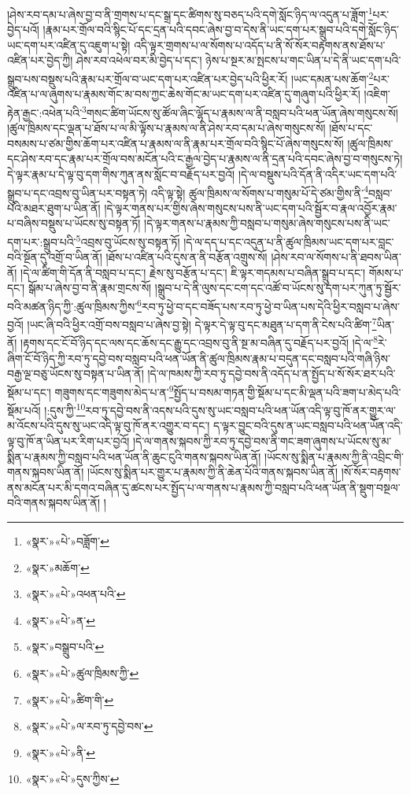 །ཤེས་རབ་དམ་པ་ཞེས་བྱ་བ་ནི་གྲགས་པ་དང་སྒྲ་དང་ཚིགས་སུ་བཅད་པའི་དགེ་སློང་ཉིད་ལ་འདུན་པ་ཟློག་\footnote{«སྣར་»«པེ་»བཟློག་}པར་བྱེད་པའོ། །རྣམ་པར་གྲོལ་བའི་སྙིང་པོ་དང་དྲན་པའི་དབང་ཞེས་བྱ་བ་དེས་ནི་ཡང་དག་པར་སྒྲུབ་པའི་དགེ་སློང་ཉིད་ཡང་དག་པར་འཛིན་དུ་འཇུག་པ་སྟེ། འདི་ལྟར་གྲགས་པ་ལ་སོགས་པ་འདོད་པ་ནི་སོ་སོར་བརྟགས་ནས་ཐོས་པ་འཛིན་པར་བྱེད་ཀྱི། ཤེས་རབ་འཕེལ་བར་མི་བྱེད་པ་དང་། ཉེས་པ་སྔར་མ་སྤངས་པ་གང་ཡིན་པ་དེ་ནི་ཡང་དག་པའི་སྒྲུབ་པས་བསྡུས་པའི་རྣམ་པར་གྲོལ་བ་ཡང་དག་པར་འཛིན་པར་བྱེད་པའི་ཕྱིར་རོ། །ཡང་དམན་པས་ཆོག་\footnote{«སྣར་»མཆོག་}པར་འཛིན་པ་ལ་ཞུགས་པ་རྣམས་གོང་མ་བས་ཀྱང་ཆེས་གོང་མ་ཡང་དག་པར་འཛིན་དུ་གཞུག་པའི་ཕྱིར་རོ། །འཇིག་རྟེན་རྒྱང་:འཕེན་པའི་\footnote{«སྣར་»«པེ་»འཕན་པའི་}གསང་ཚིག་ཡོངས་སུ་ཚོལ་ཞིང་ལྷོད་པ་རྣམས་ལ་ནི་བསླབ་པའི་ཕན་ཡོན་ཞེས་གསུངས་སོ། །ཚུལ་ཁྲིམས་དང་ལྡན་པ་ཐོས་པ་ལ་མི་ལྟོས་པ་རྣམས་ལ་ནི་ཤེས་རབ་དམ་པ་ཞེས་གསུངས་སོ། །ཐོས་པ་དང་བསམས་པ་ཙམ་གྱིས་ཆོག་པར་འཛིན་པ་རྣམས་ལ་ནི་རྣམ་པར་གྲོལ་བའི་སྙིང་པོ་ཞེས་གསུངས་སོ། །ཚུལ་ཁྲིམས་དང་ཤེས་རབ་དང་རྣམ་པར་གྲོལ་བས་མངོན་པའི་ང་རྒྱལ་བྱེད་པ་རྣམས་ལ་ནི་དྲན་པའི་དབང་ཞེས་བྱ་བ་གསུངས་ཏེ། དེ་ལྟར་རྣམ་པ་དེ་ལྟ་བུ་དག་གིས་ཀུན་ནས་སློང་བ་བརྗོད་པར་བྱའོ། །དེ་ལ་བསྡུས་པའི་དོན་ནི་འདིར་ཡང་དག་པའི་སྒྲུབ་པ་དང་འབྲས་བུ་ཡིན་པར་བསྟན་ཏེ། འདི་ལྟ་སྟེ། ཚུལ་ཁྲིམས་ལ་སོགས་པ་གསུམ་པོ་དེ་ཙམ་གྱིས་ནི་\footnote{«སྣར་»«པེ་»ན་}བསླབ་པའི་མཐར་ཐུག་པ་ཡིན་ནོ། །དེ་ལྟར་གནས་པར་གྱིས་ཞེས་གསུངས་པས་ནི་ཡང་དག་པའི་སྦྱོར་བ་རྣལ་འབྱོར་རྣམ་པ་བཞིས་བསྡུས་པ་ཡོངས་སུ་བསྟན་ཏོ། །དེ་ལྟར་གནས་པ་རྣམས་ཀྱི་བསླབ་པ་གསུམ་ཞེས་གསུངས་པས་ནི་ཡང་དག་པར་:སྒྲུབ་པའི་\footnote{«སྣར་»བསྒྲུབ་པའི་}འབྲས་བུ་ཡོངས་སུ་བསྟན་ཏོ། །དེ་ལ་དད་པ་དང་འདུན་པ་ནི་ཚུལ་ཁྲིམས་ཡང་དག་པར་བླང་བའི་སྔོན་དུ་འགྲོ་བ་ཡིན་ནོ། །ཐོས་པ་འཛིན་པའི་དུས་ན་ནི་བརྩོན་འགྲུས་སོ། །ཤེས་རབ་ལ་སོགས་པ་ནི་ཐབས་ཡིན་ནོ། །དེ་ལ་ཚིག་གི་དོན་ནི་བསླབ་པ་དང་། རྗེས་སུ་བརྩོན་པ་དང་། ཇི་ལྟར་གདམས་པ་བཞིན་སྒྲུབ་པ་དང་། གོམས་པ་དང་། སྒོམ་པ་ཞེས་བྱ་བ་ནི་རྣམ་གྲངས་སོ། །སྒྲུབ་པ་དེ་ནི་ལུས་དང་ངག་དང་འཚོ་བ་ཡོངས་སུ་དག་པར་ཀུན་ཏུ་སྦྱོར་བའི་མཚན་ཉིད་ཀྱི་:ཚུལ་ཁྲིམས་ཀྱིས་\footnote{«སྣར་»«པེ་»ཚུལ་ཁྲིམས་ཀྱི་}རབ་ཏུ་ཕྱེ་བ་དང་བཟོད་པས་རབ་ཏུ་ཕྱེ་བ་ཡིན་པས་དེའི་ཕྱིར་བསླབ་པ་ཞེས་བྱའོ། །ཡང་ཞི་བའི་ཕྱིར་འགྲོ་བས་བསླབ་པ་ཞེས་བྱ་སྟེ། དེ་ལྟར་དེ་ལྟ་བུ་དང་མཐུན་པ་དག་ནི་ངེས་པའི་ཚིག་\footnote{«སྣར་»«པེ་»ཚིག་གི་}ཡིན་ནོ། །རྟགས་དང་ངོ་བོ་ཉིད་དང་ལས་དང་ཆོས་དང་རྒྱུ་དང་འབྲས་བུ་ནི་སྔ་མ་བཞིན་དུ་བརྗོད་པར་བྱའོ། །དེ་ལ་\footnote{«སྣར་»«པེ་»ལ་རབ་ཏུ་དབྱེ་བས་}རེ་ཞིག་ངོ་བོ་ཉིད་ཀྱི་རབ་ཏུ་དབྱེ་བས་བསླབ་པའི་ཕན་ཡོན་ནི་ཚུལ་ཁྲིམས་རྣམ་པ་བདུན་དང་བསླབ་པའི་གཞི་ཉིས་བརྒྱ་ལྔ་བཅུ་ཡོངས་སུ་བསྟན་པ་ཡིན་ནོ། །དེ་ལ་ཁམས་ཀྱི་རབ་ཏུ་དབྱེ་བས་ནི་འདོད་པ་ན་སྤྱོད་པ་སོ་སོར་ཐར་པའི་སྡོམ་པ་དང་། གཟུགས་དང་གཟུགས་མེད་པ་ན་\footnote{«སྣར་»«པེ་»ནི་}སྤྱོད་པ་བསམ་གཏན་གྱི་སྡོམ་པ་དང་མི་ལྡན་པའི་ཟག་པ་མེད་པའི་སྡོམ་པའོ། །:དུས་ཀྱི་\footnote{«སྣར་»«པེ་»དུས་ཀྱིས་}རབ་ཏུ་དབྱེ་བས་ནི་འདས་པའི་དུས་སུ་ཡང་བསླབ་པའི་ཕན་ཡོན་འདི་ལྟ་བུ་ཁོ་ནར་གྱུར་ལ་མ་འོངས་པའི་དུས་སུ་ཡང་འདི་ལྟ་བུ་ཁོ་ནར་འགྱུར་བ་དང་། ད་ལྟར་བྱུང་བའི་དུས་ན་ཡང་བསླབ་པའི་ཕན་ཡོན་འདི་ལྟ་བུ་ཁོ་ན་ཡིན་པར་རིག་པར་བྱའོ། །དེ་ལ་གནས་སྐབས་ཀྱི་རབ་ཏུ་དབྱེ་བས་ནི་གང་ཟག་ཞུགས་པ་ཡོངས་སུ་མ་སྨིན་པ་རྣམས་ཀྱི་བསླབ་པའི་ཕན་ཡོན་ནི་ཆུང་ངུའི་གནས་སྐབས་ཡིན་ནོ། །ཡོངས་སུ་སྨིན་པ་རྣམས་ཀྱི་ནི་འབྲིང་གི་གནས་སྐབས་ཡིན་ནོ། །ཡོངས་སུ་སྨིན་པར་གྱུར་པ་རྣམས་ཀྱི་ནི་ཆེན་པོའི་གནས་སྐབས་ཡིན་ནོ། །སོ་སོར་བརྟགས་ནས་མངོན་པར་མི་དགའ་བཞིན་དུ་ཚངས་པར་སྤྱོད་པ་ལ་གནས་པ་རྣམས་ཀྱི་བསླབ་པའི་ཕན་ཡོན་ནི་སྡུག་བསྔལ་བའི་གནས་སྐབས་ཡིན་ནོ། །
